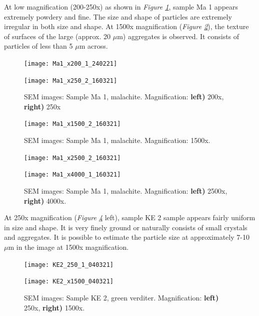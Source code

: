 At low magnification (200-250x) as shown in \textit{Figure \ref{fig:Ma1_sem_2}}, sample Ma 1 appears extremely powdery and fine. The size and shape of particles are extremely irregular in both size and shape. At 1500x magnification (\textit{Figure \ref{fig:Ma1_sem_3}}), the texture of surfaces of the large (approx. 20 $\mu$m) aggregates is observed. It consists of particles of less than 5 $\mu$m across. 

\begin{figure}[H]
\centering
\begin{minipage}{.45\textwidth}
  \centering
  \texttt{[image: Ma1\_x200\_1\_240221]}
\end{minipage}
\begin{minipage}{.45\textwidth}
  \centering
  \texttt{[image: Ma1\_x250\_2\_160321]}
\end{minipage}
\caption[SEM images: Sample Ma 1, malachite]{SEM images: Sample Ma 1, malachite. Magnification: \textbf{left)} 200x, \textbf{right)} 250x}
\label{fig:Ma1_sem_2}
\end{figure}

\begin{figure}[H]
\centering
  \texttt{[image: Ma1\_x1500\_2\_160321]}
\caption[SEM images: Sample Ma 1, malachite]{SEM images: Sample Ma 1, malachite. Magnification: 1500x.}
\label{fig:Ma1_sem_3}
\end{figure}

\begin{figure}[H]
\centering
\begin{minipage}{.45\textwidth}
  \centering
  \texttt{[image: Ma1\_x2500\_2\_160321]}
\end{minipage}
\begin{minipage}{.45\textwidth}
  \centering
  \texttt{[image: Ma1\_x4000\_1\_160321]}
\end{minipage}
\caption[SEM images: Sample Ma 1, malachite]{SEM images: Sample Ma 1, malachite. Magnification: \textbf{left)} 2500x, \textbf{right)} 4000x.}
\label{fig:Ma1_sem_4}
\end{figure}



At 250x magnification (\textit{Figure \ref{fig:KE2_sem_2}} left), sample KE 2 sample appears fairly uniform in size and shape. It is very finely ground or naturally consists of small crystals and aggregates. It is possible to estimate the particle size at approximately 7-10 $\mu$m in the image at 1500x magnification.

\begin{figure}[H]
\centering
\begin{minipage}{.45\textwidth}
  \centering
  \texttt{[image: KE2\_250\_1\_040321]}
\end{minipage}
\begin{minipage}{.45\textwidth}
  \centering
  \texttt{[image: KE2\_x1500\_040321]}
\end{minipage}
\caption[SEM images: Sample KE 2, green verditer]{SEM images: Sample KE 2, green verditer. Magnification: \textbf{left)} 250x, \textbf{right)} 1500x.}
\label{fig:KE2_sem_2}
\end{figure}



